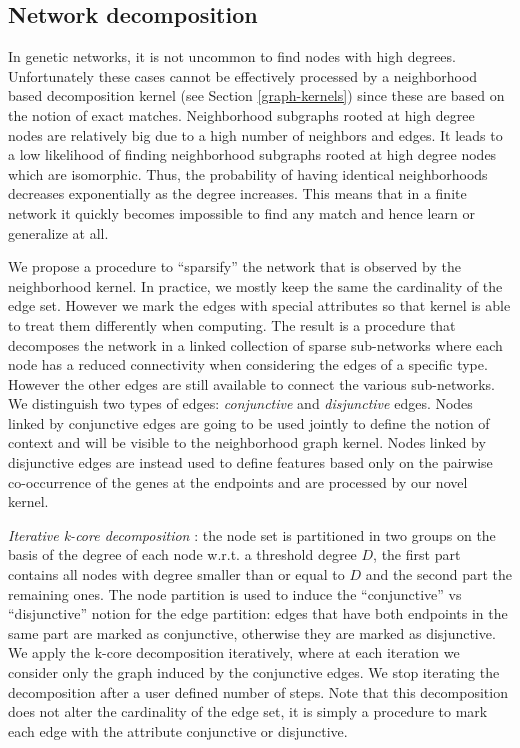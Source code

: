 \documentclass[review]{elsarticle}
\begin{document}
\subsection{Network decomposition} 
\label{network-decomposition}
In genetic networks, it is not uncommon to find nodes with high degrees. Unfortunately these cases cannot be effectively processed by a neighborhood based decomposition kernel (see Section \ref{graph-kernels}) since these are based on the notion of exact matches. Neighborhood subgraphs rooted at high degree nodes are relatively big due to a high number of neighbors and edges. It leads to a low likelihood of finding neighborhood subgraphs rooted at high degree nodes which are isomorphic. Thus, the probability of having identical neighborhoods decreases exponentially as the degree increases. This means that in a finite network it quickly becomes impossible to find any match and hence learn or generalize at all. 

We propose a procedure to ``sparsify'' the network that is observed by the neighborhood kernel. In practice, we mostly keep the same the cardinality of the edge set. However we mark the edges with special attributes so that kernel is able to treat them differently when computing. The result is a procedure that decomposes the network in a linked collection of sparse sub-networks where each node has a reduced connectivity when considering the edges of a specific type. However the other edges are still available to connect the various sub-networks. We distinguish two types of edges: {\em conjunctive} and {\em disjunctive} edges. Nodes linked by conjunctive edges are going to be used jointly to define the notion of context and will be visible to the neighborhood graph kernel. Nodes linked by disjunctive edges are instead used to define features based only on the pairwise co-occurrence of the genes at the endpoints and are processed by our novel kernel.

\textit{Iterative k-core decomposition} \cite{alvarez2005k}: the node set is partitioned in two groups on the basis of the degree of each node w.r.t. a threshold degree $D$, the first part contains all nodes with degree smaller than or equal to $D$ and the second part the remaining ones. The node partition is used to induce the ``conjunctive'' vs ``disjunctive'' notion for the edge partition: edges that have both endpoints in the same part are marked as conjunctive, otherwise they are marked as disjunctive. We apply the k-core decomposition iteratively, where at each iteration we consider only the graph induced by the conjunctive edges. We stop iterating the decomposition after a user defined number of steps. Note that this decomposition does not alter the cardinality of the edge set, it is simply a procedure to mark each edge with the attribute conjunctive or disjunctive.  
\end{document}
